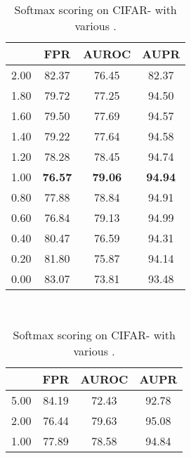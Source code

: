 \documentclass{article}
\begin{document}
\begin{table}[t]
\centering
\parbox{.30\linewidth}{
\centering
\scriptsize
\caption{Softmax scoring on CIFAR- with various .} \label{tab: ablation sigma full se cifar100}
\vspace{5pt}
{
\begin{tabular}{c|ccc}
\toprule[1.5pt]
            & FPR     & AUROC       & AUPR      \\
\midrule[0.6pt]
2.00               & 82.37                  & 76.45                  & 82.37 \\
1.80               & 79.72                  & 77.25                  & 94.50 \\
1.60               & 79.50                  & 77.69                  & 94.57 \\
1.40               & 79.22                  & 77.64                  & 94.58 \\
1.20               & 78.28                  & 78.45                  & 94.74 \\ 
\cellcolor{greyC}1.00               & \cellcolor{greyC}\textbf{76.57}                  & \cellcolor{greyC}\textbf{79.06}                  & \cellcolor{greyC}\textbf{94.94} \\ 
0.80               & 77.88                  & 78.84                  & 94.91 \\
0.60               & 76.84                  & 79.13                  & 94.99 \\
0.40               & 80.47                  & 76.59                  & 94.31 \\
0.20               &  81.80                 & 75.87                  & 94.14 \\
0.00               &  83.07                 & 73.81                  & 93.48 \\
\bottomrule[1.5pt]      
\end{tabular}
}}~~
\parbox{.30\linewidth}{
\centering
\caption{Softmax scoring on CIFAR- with various .} 
\scriptsize
\vspace{5pt}
{
\begin{tabular}{c|ccc}
\toprule[1.5pt]
            & FPR     & AUROC      & AUPR      \\
\midrule[0.6pt]
5.00               & 84.19                  & 72.43                  & 92.78 \\
2.00               & 76.44                  & 79.63                  & 95.08 \\
1.00               & 77.89                  & 78.58                  & 94.84 \\

\end{tabular}}}
\end{table}
\end{document}
